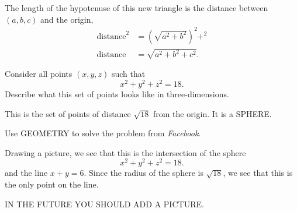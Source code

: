 \documentclass[noauthor,nooutcomes]{ximera}
\begin{document}
\begin{question}
\begin{freeResponse}
\begin{enumerate}
\begin{center}
    \end{center}
    The length of the hypotenuse of this new triangle is the distance
    between $(a,b,c)$ and the origin,
    \begin{align*}
      \text{distance}^2&= \left(\sqrt{a^2+b^2}\right)^2 + ^2\\
       \text{distance}&=  \sqrt{a^2+b^2 + c^2}.
    \end{align*}
    \end{enumerate}
  \end{freeResponse}
\end{question}
\mynewpage


\begin{question}
  Consider all points $(x,y,z)$ such that
  \[
  x^2 + y^2 + z^2 = 18.
  \]
  Describe what this set of points looks like in three-dimensions.
  \begin{freeResponse}
    This is the set of points of distance $\sqrt{18}$ from the
    origin. It is a SPHERE.
  \end{freeResponse}
\end{question}
\mynewpage


\begin{question}
  Use GEOMETRY to solve the problem from \textsl{Facebook}.
  \begin{freeResponse}
    Drawing a picture, we see that this is the intersection of the sphere
      \[
      x^2 + y^2 + z^2 = 18.
      \]
      and the line $x+y=6$. Since the radius of the sphere is
      $\sqrt{18}$, we see that this is the only point on the line.

      IN THE FUTURE YOU SHOULD ADD A PICTURE.
  \end{freeResponse}
\end{question}
\end{document}
